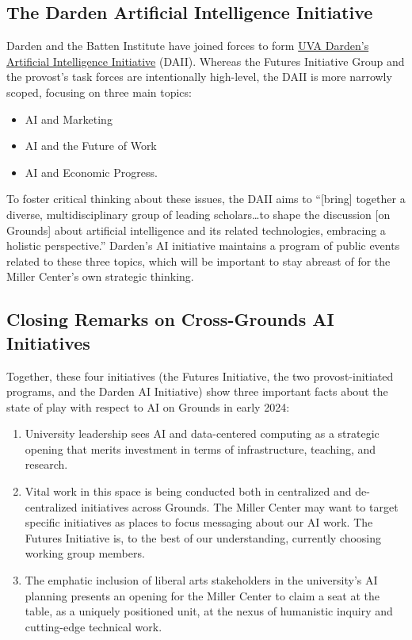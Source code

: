 \documentclass[12pt, oneside]{article}   	%
\begin{document}
\subsection{The Darden Artificial Intelligence Initiative}
Darden and the Batten Institute have joined forces to form \href{https://www.darden.virginia.edu/intelligence}{UVA Darden’s Artificial Intelligence Initiative} (DAII).  Whereas the Futures Initiative Group and the provost's task forces are intentionally high-level, the DAII is more narrowly scoped, focusing on three main topics:
\begin{itemize}
\item AI and Marketing
\item AI and the Future of Work
\item AI and Economic Progress.
\end{itemize}
To foster critical thinking about these issues, the DAII aims to “[bring] together a diverse, multidisciplinary group of leading scholars…to shape the discussion [on Grounds] about artificial intelligence and its related technologies, embracing a holistic perspective.”  Darden’s AI initiative maintains a program of public events related to these three topics, which will be important to stay abreast of for the Miller Center’s own strategic thinking.


\subsection{Closing Remarks on Cross-Grounds AI Initiatives}
Together, these four initiatives (the Futures Initiative, the two provost-initiated programs, and the Darden AI Initiative) show three important facts about the state of play with respect to AI on Grounds in early 2024:
\begin{enumerate}
\item University leadership sees AI and data-centered computing as a strategic opening that merits investment in terms of infrastructure, teaching, and research.
\item Vital work in this space is being conducted both in centralized and de-centralized initiatives across Grounds.  The Miller Center may want to target specific initiatives as places to focus messaging about our AI work.  The Futures Initiative is, to the best of our understanding, currently choosing working group members.
\item The emphatic inclusion of liberal arts stakeholders in the university’s AI planning presents an opening for the Miller Center to claim a seat at the table, as a uniquely positioned unit, at the nexus of humanistic inquiry and cutting-edge technical work.
\end{enumerate}
\end{document}
